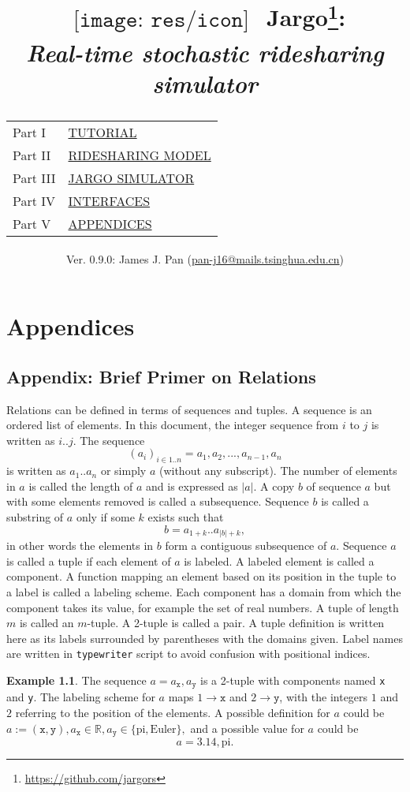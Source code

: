 \documentclass{report}
\title{
  $
  \begin{array}{l}
  \texttt{[image: res/icon]}
  \end{array}
  $
  Jargo\footnote{\url{https://github.com/jargors}}:\\
  \large{\textbf{\textit{Real-time stochastic ridesharing simulator}}}\\
  \vspace{2em}
  {
    \small
    \begin{tabular}{lp{.6\textwidth}}
    \toprule
    Part I  &\hyperref[part-tutorial]{\textsc{TUTORIAL}}\\
    Part II &\hyperref[part-model]{\textsc{RIDESHARING MODEL}}\\
    Part III&\hyperref[part-simulator]{\textsc{JARGO SIMULATOR}}\\
    Part IV &\hyperref[part-interfaces]{\textsc{INTERFACES}}\\
    Part V  &\hyperref[part-appendices]{\textsc{APPENDICES}}\\
    \bottomrule
    \end{tabular}
  }
}
\author{
  \small{Ver. 0.9.0: James J. Pan (\href{mailto:pan-j16@mails.tsinghua.edu.cn}{pan-j16@mails.tsinghua.edu.cn})}
}
\theoremstyle{definition}                   %
\newtheorem{example}{Example}
\begin{document}
\maketitle
\pagestyle{noweb}

\renewcommand{\thepage}{\roman{page}}
\setcounter{page}{1}

\tableofcontents



\part{Appendices}
\label{part-appendices}

\appendix

\chapter{Appendix: Brief Primer on Relations}
\label{ap-primer}

Relations can be defined in terms of sequences and tuples.  A sequence is an
ordered list of elements.  In this document, the integer sequence from $i$ to
$j$ is written as $i..j$. The sequence $$(a_i)_{i\in
1..n}=a_1,a_2,...,a_{n-1},a_n$$ is written as $a_1..a_n$ or simply $a$ (without
any subscript). The number of elements in $a$ is called the length of $a$ and
is expressed as $|a|$.  A copy $b$ of sequence $a$ but with some elements
removed is called a subsequence.  Sequence $b$ is called a substring of $a$
only if some $k$ exists such that $$b=a_{1+k}..a_{|b|+k},$$ in other words the
elements in $b$ form a contiguous subsequence of $a$.  Sequence $a$ is called a
tuple if each element of $a$ is labeled. A labeled element is called a
component.  A function mapping an element based on its position in the tuple to
a label is called a labeling scheme.  Each component has a domain from which
the component takes its value, for example the set of real numbers.  A tuple of
length $m$ is called an $m$-tuple. A 2-tuple is called a pair.  A tuple
definition is written here as its labels surrounded by parentheses with the
domains given. Label names are written in \texttt{typewriter} script to avoid
confusion with positional indices.

\begin{example}
\label{ex:tuple}
The sequence $a=a_\texttt{x},a_\texttt{y}$ is a 2-tuple with components named
\texttt{x} and \texttt{y}.  The labeling scheme for $a$ maps $1\rightarrow
\texttt{x}$ and $2\rightarrow \texttt{y}$, with the integers $1$ and $2$
referring to the position of the elements. A possible definition for $a$ could
be $a:=(\texttt{x},\texttt{y}), a_\texttt{x}\in\mathbb{R},
a_\texttt{y}\in\{\textrm{pi},\textrm{Euler}\},$ and a possible value for $a$
could be $$a=3.14,\textrm{pi}.$$
\end{example}
\end{document}
